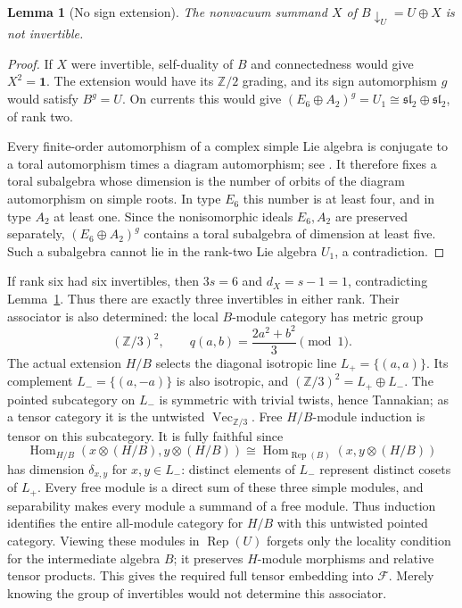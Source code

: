 \documentclass[11pt,a4paper]{article}
\newtheorem{lemma}[theorem]{Lemma}
\theoremstyle{definition}
\begin{document}
\begin{lemma}[No sign extension]\label{lem:no-sign-extension}
The nonvacuum summand $X$ of $B\downarrow_U=U\oplus X$ is not
invertible.
\end{lemma}
\begin{proof}
If $X$ were invertible, self-duality of $B$ and connectedness would
give $X^2=\mathbf1$. The extension would have its $\mathbb Z/2$
grading, and its sign automorphism $g$ would satisfy $B^g=U$.
On currents this would give
$(E_6\oplus A_2)^g=U_1\cong\mathfrak{sl}_2\oplus\mathfrak{sl}_2$,
of rank two.

Every finite-order automorphism of a complex simple Lie algebra is
conjugate to a toral automorphism times a diagram automorphism;
see \cite[Section~5.2]{RLYG}. It therefore fixes a toral subalgebra
whose dimension is the number of orbits of the diagram automorphism
on simple roots. In type $E_6$ this number is at least four, and in
type $A_2$ at least one. Since the nonisomorphic ideals $E_6,A_2$
are preserved separately, $(E_6\oplus A_2)^g$ contains a toral
subalgebra of dimension at least five. Such a subalgebra cannot lie
in the rank-two Lie algebra $U_1$, a contradiction.
\end{proof}

If rank six had six invertibles, then $3s=6$ and
$d_X=s-1=1$, contradicting Lemma~\ref{lem:no-sign-extension}.
Thus there are
exactly three invertibles in either rank. Their associator is also
determined: the local $B$-module category has metric group
\[
 (\mathbb Z/3)^2,\qquad q(a,b)=\frac{2a^2+b^2}{3}\pmod1.
\]
The actual extension $H/B$ selects the diagonal isotropic line
$L_+=\{(a,a)\}$. Its complement
$L_-=\{(a,-a)\}$ is also isotropic, and
$(\mathbb Z/3)^2=L_+\oplus L_-$.
The pointed subcategory on $L_-$ is symmetric with trivial twists,
hence Tannakian; as a tensor category it is the untwisted
$\operatorname{Vec}_{\mathbb Z/3}$. Free $H/B$-module induction is
tensor on this subcategory. It is fully faithful since
\[
 \operatorname{Hom}_{H/B}(x\otimes(H/B),y\otimes(H/B))
 \cong\operatorname{Hom}_{\operatorname{Rep}(B)}
       (x,y\otimes(H/B))
\]
has dimension $\delta_{x,y}$ for $x,y\in L_-$: distinct elements of
$L_-$ represent distinct cosets of $L_+$. Every free module is a
direct sum of these three simple modules, and separability makes
every module a summand of a free module. Thus induction identifies the entire
all-module category for $H/B$ with this untwisted pointed category.
Viewing these modules in $\operatorname{Rep}(U)$ forgets only the
locality condition for the intermediate algebra $B$; it preserves
$H$-module morphisms and relative tensor products. This gives the
required full tensor embedding into $\mathcal F$.
Merely knowing the group of invertibles would not determine this
associator.
\end{document}
